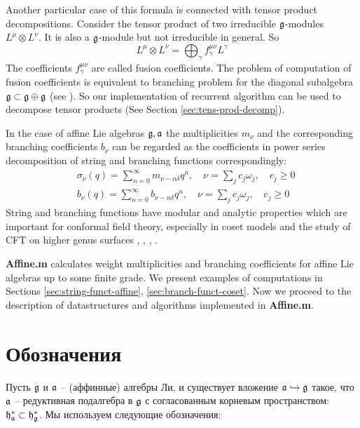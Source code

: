 Another particular case of this formula is connected with tensor
product decompositions. Consider the tensor product of two
irreducible $\mathfrak{g}$-modules $L^{\mu}\otimes L^{\nu}$. It is also a
$\mathfrak{g}$-module but not irreducible in general. So
\begin{equation}
  \label{eq:19}
  L^{\mu}\otimes L^{\nu}=\bigoplus_{\gamma} f^{\mu\nu}_{\gamma}L^{\gamma}
\end{equation}
The coefficients $f^{\mu\nu}_{\gamma}$ are called fusion
coefficients. The problem of computation of fusion coefficients is
equivalent to branching problem for the diagonal subalgebra
$\mathfrak{g}\subset \mathfrak{g}\oplus \mathfrak{g}$ (see \cite{LyakhovskyPostnova2011}). So our implementation of recurrent algorithm can be used to decompose tensor products (See Section \ref{sec:tens-prod-decomp}).

In the case of affine Lie algebras $\mathfrak{g}, \mathfrak{a}$  the multiplicities
$m_{\nu}$ and the corresponding branching coefficients $b_{\nu}$
can be regarded as the coefficients in power series decomposition
of string and branching functions correspondingly:
\begin{align}
  \label{eq:21}
  &\sigma_{\nu}(q)=\sum_{n=0}^{\infty} m_{\nu-n\delta} q^n, \quad \nu=\sum_j c_j \omega_j,\quad c_j\geq 0\\
  & b_{\nu}(q)=\sum_{n=0}^{\infty} b_{\nu-n\delta} q^n,\quad  \nu=\sum_j c_j \omega_j, \quad c_j\geq 0
\end{align}
String and branching functions have  modular and analytic properties which are important for conformal field theory, especially in  coset models and the study of CFT on higher genus surfaces \cite{kac1988modular}, \cite{difrancesco1997cft}, \cite{Walton:1999xc}, \cite{walton1989conformal}.


{\bf Affine.m}  calculates weight multiplicities and branching coefficients for affine Lie algebras up to some finite grade. We present examples of computations in Sections \ref{sec:string-funct-affine}, \ref{sec:branch-funct-coset}. Now we proceed to the description of datastructures and algorithms implemented in {\bf Affine.m}.


 \section{Обозначения}
 
 \label{sec:notation}
 Пусть $\frak{g}$ и $\frak{a}$ -- (аффинные) алгебры Ли, и существует вложение  $\frak{a}\hookrightarrow \frak{g}$ такое, что  $\frak{a}$ -- редуктивная подалгебра в $\frak{g}$ с согласованным корневым пространством: $\frak{%
 h}_{\frak{a}}^{\ast }\subset \frak{h}_{\frak{g}}^{\ast }$. Мы используем следующие обозначения:
 
